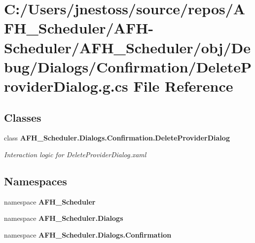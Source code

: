 \section{C\+:/\+Users/jnestoss/source/repos/\+A\+F\+H\+\_\+\+Scheduler/\+A\+F\+H-\/\+Scheduler/\+A\+F\+H\+\_\+\+Scheduler/obj/\+Debug/\+Dialogs/\+Confirmation/\+Delete\+Provider\+Dialog.g.\+cs File Reference}
\label{_debug_2_dialogs_2_confirmation_2_delete_provider_dialog_8g_8cs}
\subsection*{Classes}
\begin{DoxyCompactItemize}
\item 
class \textbf{ A\+F\+H\+\_\+\+Scheduler.\+Dialogs.\+Confirmation.\+Delete\+Provider\+Dialog}
\begin{DoxyCompactList}\small\item\em Interaction logic for Delete\+Provider\+Dialog.\+xaml \end{DoxyCompactList}\end{DoxyCompactItemize}
\subsection*{Namespaces}
\begin{DoxyCompactItemize}
\item 
namespace \textbf{ A\+F\+H\+\_\+\+Scheduler}
\item 
namespace \textbf{ A\+F\+H\+\_\+\+Scheduler.\+Dialogs}
\item 
namespace \textbf{ A\+F\+H\+\_\+\+Scheduler.\+Dialogs.\+Confirmation}
\end{DoxyCompactItemize}

